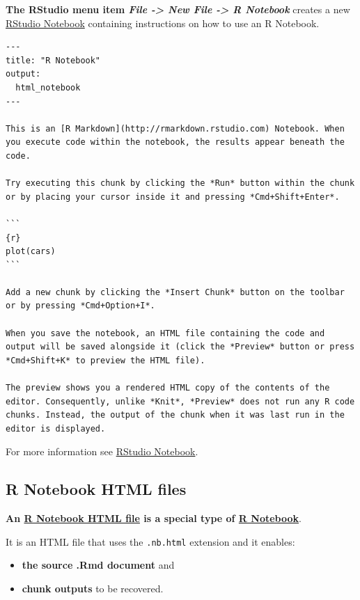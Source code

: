 \documentclass[]{book}
\providecommand{\tightlist}{%
  \setlength{\itemsep}{0pt}\setlength{\parskip}{0pt}}
\theoremstyle{definition}
\theoremstyle{definition}
\theoremstyle{definition}
\theoremstyle{remark}
\begin{document}
\textbf{The RStudio menu item \emph{File -\textgreater{} New File
-\textgreater{} R Notebook}} creates a new
\href{https://rmarkdown.rstudio.com/r_notebooks.html}{RStudio Notebook}
containing instructions on how to use an R Notebook.

\begin{verbatim}
---
title: "R Notebook"
output:
  html_notebook
---

This is an [R Markdown](http://rmarkdown.rstudio.com) Notebook. When you execute code within the notebook, the results appear beneath the code. 

Try executing this chunk by clicking the *Run* button within the chunk or by placing your cursor inside it and pressing *Cmd+Shift+Enter*. 

```
{r}
plot(cars)
```

Add a new chunk by clicking the *Insert Chunk* button on the toolbar or by pressing *Cmd+Option+I*.

When you save the notebook, an HTML file containing the code and output will be saved alongside it (click the *Preview* button or press *Cmd+Shift+K* to preview the HTML file). 

The preview shows you a rendered HTML copy of the contents of the editor. Consequently, unlike *Knit*, *Preview* does not run any R code chunks. Instead, the output of the chunk when it was last run in the editor is displayed.
\end{verbatim}

For more information see
\href{https://rmarkdown.rstudio.com/r_notebooks.html}{RStudio Notebook}.

\hypertarget{r-notebook-html-files}{%
\subsection{R Notebook HTML files}\label{r-notebook-html-files}}

\textbf{An \href{https://rmarkdown.rstudio.com/r_notebook_format.html}{R
Notebook HTML file} is a special type of
\protect\hyperlink{r-notebook}{R Notebook}}.

It is an HTML file that uses the \texttt{.nb.html} extension and it
enables:

\begin{itemize}
\tightlist
\item
  \textbf{the source .Rmd document} and
\item
  \textbf{chunk outputs} to be recovered.
\end{itemize}
\end{document}
